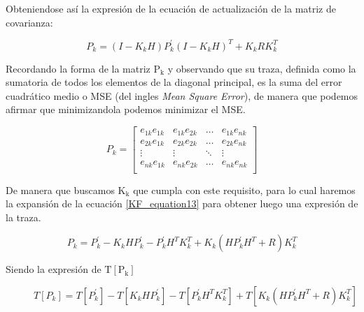 \documentclass[10pt,a4paper]{article}
\begin{document}
	\noindent Obteniendose así la expresión de la ecuación de actualización de 
    la matriz de covarianza:
	
	\begin{figure}[h!]
		\begin{center}
			\begin{equation}
				P_k = (I-K_k H)P^\prime_k(I-K_k H)^T + K_k R K_k^T 
				\label{KF_equation13}
			\end{equation}	
		\end{center}
	\end{figure}
	
	\clearpage
	
    \noindent Recordando la forma de la matriz $\mathrm{P_k}$ y observando que 
    su traza, definida como la sumatoria de todos los elementos de la diagonal 
    principal, es la suma del error cuadrático medio o MSE (del ingles
    \emph{Mean Square Error}), de manera que podemos afirmar que minimizandola 
    podemos minimizar el MSE.

	\begin{equation}
		P_k = 
		\begin{bmatrix}
			e_{1k}e_{1k} & e_{1k}e_{2k} &	\dots  & e_{1k}e_{nk} \\
			e_{2k}e_{1k} & e_{2k}e_{2k} &	\dots  & e_{2k}e_{nk} \\
			\vdots       &   \vdots     &	\ddots & \vdots       \\
			e_{nk}e_{1k} & e_{nk}e_{2k} &	\dots  & e_{nk}e_{nk} \\
		\end{bmatrix}
	\end{equation}
	
    \noindent De manera que buscamos $\mathrm{K_k}$ que cumpla con este 
    requisito, para lo cual haremos la expansión de la ecuación 
    \ref{KF_equation13} para obtener luego una expresión de la traza.
	
	\begin{figure}[h!]
		\begin{center}
			\begin{equation}
				P_k = P^\prime_k - K_k H P^\prime_k - P^\prime_k H^T K^T_k + K_k (H P^\prime_k H^T + R) K^T_k
				\label{KF_equation14}
			\end{equation}	
		\end{center}
	\end{figure}
	
    \noindent Siendo la expresión de $\mathrm{T[P_k]}$
	
	\begin{figure}[h!]
		\begin{center}
			\begin{equation}
				T[P_k] = T[P^\prime_k] - T[K_k H P^\prime_k] - T[P^\prime_k H^T K^T_k] + T[K_k (H P^\prime_k H^T + R) K^T_k]
				\label{KF_equation15}
			\end{equation}	
		\end{center}
	\end{figure}
	
\end{document}
